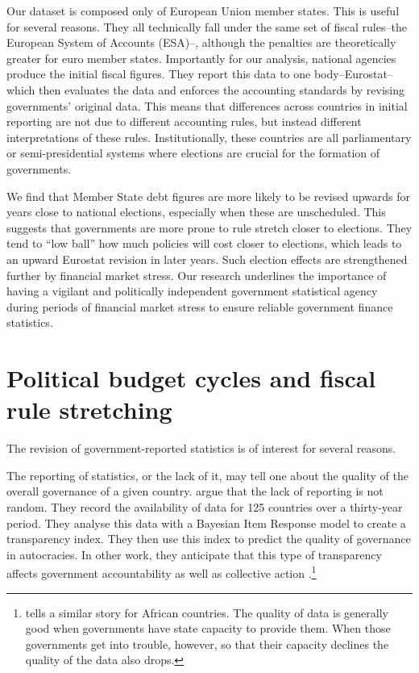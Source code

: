 \documentclass[]{article}
\begin{document}
Our dataset is composed only of European Union member states. This is useful for several reasons. They all technically fall under the same set of fiscal rules--the European System of Accounts (ESA)--, although the penalties are theoretically greater for euro member states.  Importantly for our analysis, national agencies produce the initial fiscal figures. They report this data to one body--Eurostat--which then evaluates the data and enforces the accounting standards by revising governments' original data. This means that differences across countries in initial reporting are not due to different accounting rules, but instead  different interpretations of these rules. Institutionally, these countries are all parliamentary or semi-presidential systems where elections are crucial for the formation of governments.

We find that Member State debt figures are more likely to be revised upwards for years close to national elections, especially when these are unscheduled. This suggests that governments are more prone to rule stretch closer to elections. They tend to ``low ball'' how much policies will cost closer to elections, which leads to an upward Eurostat revision in later years. Such election effects are strengthened further by financial market stress. Our research underlines the importance of having a vigilant and politically independent government statistical agency during periods of financial market stress to ensure reliable government finance statistics.

\section{Political budget cycles and fiscal rule stretching}

The revision of government-reported statistics is of interest for several reasons.

The reporting of statistics, or the lack of it, may tell one about the quality of the overall governance of a given country. \cite{Hollyer2014} argue that the lack of reporting is not random. They record the availability of data for 125 countries over a thirty-year period. They analyse this data with a Bayesian Item Response model to create a transparency index. They then use this index to predict the quality of governance in autocracies. In other work, they anticipate that this type of transparency affects government accountability as well as collective action \citep{hollyerforthcoming}.\footnote{\cite{jervin2013} tells a similar story for African countries. The quality of data is generally good when governments have state capacity to provide them. When those governments get into trouble, however, so that their capacity declines the quality of the data also drops.}
\end{document}

